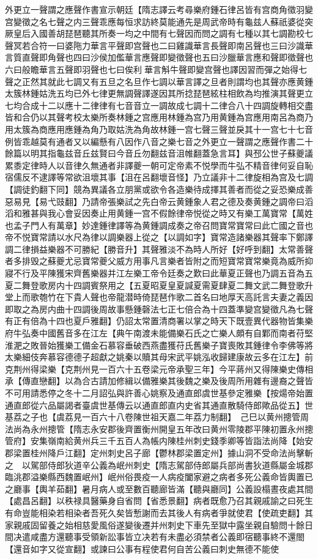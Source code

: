 外更立一聲謂之應聲作書宣示朝廷【隋志譯云考尋樂府鍾石律呂皆有宫商角徵羽變宫變徵之名七聲之内三聲乖應每恒求訪終莫能通先是周武帝時有龜兹人蘇祇婆從突厥皇后入國善胡琵琶聽其所奏一均之中間有七聲因而問之調有七種以其七調勘校七聲冥若合符一曰婆陁力華言平聲即宫聲也二曰雞識華言長聲即南呂聲也三曰沙識華言質直聲即角聲也四曰沙侯加儖華言應聲即變徵聲也五曰沙臘華言應和聲即徵聲也六曰般瞻華言五聲即羽聲也七曰俟利華言斛牛聲即變宫聲也譯因習而彈之始得七聲之正然其就此七調又有五旦之名旦作七調以華言譯之旦者則謂均也其聲亦應黄鍾太簇林鍾姑洗五均已外七律更無調聲譯遂因其所捻琵琶絃柱相飲為均推演其聲更立七均合成十二以應十二律律有七音音立一調故成七調十二律合八十四調旋轉相交盡皆和合仍以其聲考校太樂所奏林鍾之宫應用林鍾為宫乃用黄鍾為宫應用南呂為商乃用太簇為商應用應鍾為角乃取姑洗為角故林鍾一宫七聲三聲並戾其十一宫七十七音例皆乖越莫有通者又以編懸有八因作八音之樂七音之外更立一聲謂之應聲作書二十餘篇以明其指龜兹音丘兹賢曰今音丘勿翻兹音沮帷翻蓋急言耳】與邳公世子蘇夔議累黍定律時人以音律久無通者非譯夔一朝可定帝素不悦學而牛弘不精音律何妥自恥宿儒反不逮譯等常欲沮壞其事【沮在呂翻壞音怪】乃立議非十二律旋相為宫及七調【調徒釣翻下同】競為異議各立朋黨或欲令各造樂待成擇其善者而從之妥恐樂成善惡易見【易弋豉翻】乃請帝張樂試之先白帝云黄鍾象人君之德及奏黄鍾之調帝曰滔滔和雅甚與我心會妥因奏止用黄鍾一宫不假餘律帝悦從之時又有樂工萬寶常【萬姓也孟子門人有萬章】妙達鍾律譯等為黄鍾調成奏之帝召問寶常寶常曰此亡國之音也帝不悦寶常請以水尺為律以調樂器上從之【以調如字】寶常造諸樂器其聲率下鄭譯調二律損益樂器不可勝紀【勝音升】其聲雅淡不為時人所好【好呼到翻】太常善聲者多排毁之蘇夔尤忌寶常夔父威方用事凡言樂者皆附之而短寶常寶常樂竟為威所抑寢不行及平陳獲宋齊舊樂器并江左樂工帝令廷奏之歎曰此華夏正聲也乃調五音為五夏二舞登歌房内十四調賓祭用之【五夏昭夏皇夏諴夏需夏肆夏二舞文武二舞登歌升堂上而歌匏竹在下貴人聲也帝龍潜時倚琵琶作歌二首名曰地厚天高託言夫妻之義因即取之為房内曲十四調後周故事懸鍾磬法七正七倍合為十四蓋準變宫變徵凡為七聲有正有倍為十四也夏戶雅翻】仍詔太常置清商署以掌之時天下既壹異代器物皆集樂府牛弘奏中國舊音多在江左【典午南渡未能備樂石氏之亡樂人頗有自鄴而南者苻堅淮淝之敗晉始獲樂工備金石慕容垂破西燕盡獲苻氏舊樂子寶喪敗其鍾律令李佛等將太樂細伎奔慕容德德子超獻之姚秦以贖其母宋武平姚泓收歸建康故云多在江左】前克荆州得梁樂【克荆州見一百六十五卷梁元帝承聖三年】今平蔣州又得陳樂史傳相承【傳直戀翻】以為合古請加修緝以備雅樂其後魏之樂及後周所用雜有邊裔之聲皆不可用請悉停之冬十二月詔弘與許善心姚察及通直郎虞世基參定雅樂【按煬帝始置通直郎從六品屬謁者臺虞世基傳云以通直郎直内史省其通直散騎侍郎歟品從五】世基荔之子也【虞荔見一百六十八卷陳世祖天嘉二年荔力制翻】　己巳以黄州摠管周法尚為永州摠管【隋志永安郡後齊置衡州開皇五年改曰黄州零陵郡平陳初置永州摠管府】安集嶺南給黄州兵三千五百人為帳内陳桂州刺史錢季卿等皆詣法尚降【始安郡梁置桂州降戶江翻】定州刺史呂子廊【鬱林郡梁置定州】據山洞不受命法尚擊斬之　以駕部侍郎狄道辛公義為岷州刺史【隋志駕部侍郎屬兵部尚書狄道縣屬金城郡臨洮郡溢樂縣西魏置岷州】岷州俗畏疫一人病疫闔家避之病者多死公義命皆輿置已之廳事【輿羊茹翻】暑月病人或至數百聽廊皆滿【聽與廳同】公義設榻晝夜處其間【處昌呂翻】以秩禄具醫藥身自省問【省悉景翻】病者既愈乃召其親戚諭之曰死生有命豈能相染若相染者吾死久矣皆慙謝而去其後人有病者爭就使君【使疏吏翻】其家親戚固留養之始相慈愛風俗遂變後遷并州刺史下車先至獄中露坐親自驗問十餘日間决遣咸盡方還聽事受領新訟事皆立决若有未盡必須禁者公義即宿聽事終不還閤【還音如字又從宣翻】或諫曰公事有程使君何自苦公義曰刺史無德不能使